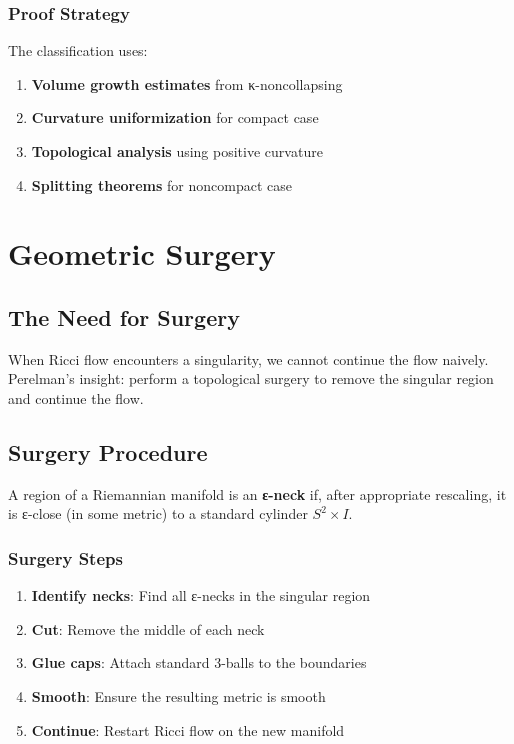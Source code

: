 \subsection{Proof Strategy}

The classification uses:
\begin{enumerate}
\item \textbf{Volume growth estimates} from κ-noncollapsing
\item \textbf{Curvature uniformization} for compact case
\item \textbf{Topological analysis} using positive curvature
\item \textbf{Splitting theorems} for noncompact case
\end{enumerate}

\chapter{Geometric Surgery}
\label{chap:surgery}

\section{The Need for Surgery}

When Ricci flow encounters a singularity, we cannot continue the flow naively. Perelman's insight: perform a topological surgery to remove the singular region and continue the flow.

\section{Surgery Procedure}

\begin{definition}[ε-Neck]
\label{def:epsilon_neck}
A region of a Riemannian manifold is an \textbf{ε-neck} if, after appropriate rescaling, it is ε-close (in some metric) to a standard cylinder $S^2 \times I$.
\end{definition}

\subsection{Surgery Steps}

\begin{enumerate}
\item \textbf{Identify necks}: Find all ε-necks in the singular region
\item \textbf{Cut}: Remove the middle of each neck
\item \textbf{Glue caps}: Attach standard 3-balls to the boundaries
\item \textbf{Smooth}: Ensure the resulting metric is smooth
\item \textbf{Continue}: Restart Ricci flow on the new manifold
\end{enumerate}

